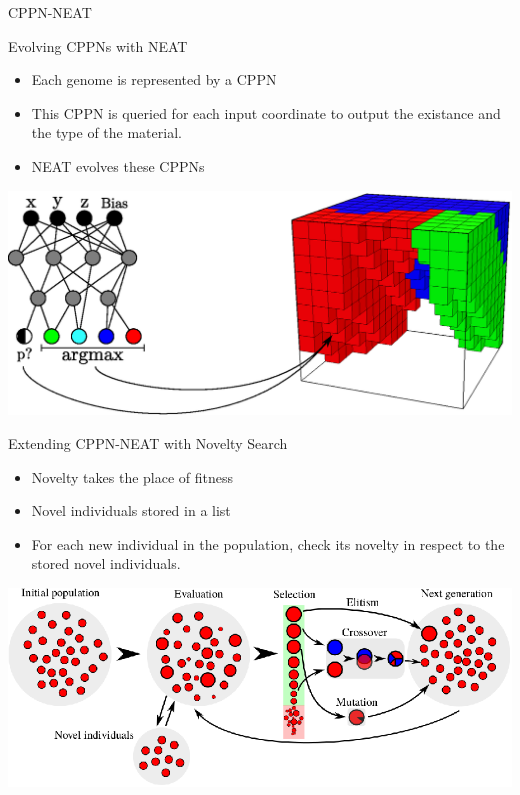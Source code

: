 \documentclass[6pt]{beamer}
\begin{document}
\begin{frame}{CPPN-NEAT}
\begin{block}{Evolving CPPNs with NEAT}
\begin{itemize}
\item Each genome is represented by a CPPN
\item This CPPN is queried for each input coordinate to output the existance and the type of the material.
\item NEAT evolves these CPPNs
\end{itemize}
\end{block}
\begin{center}
\includegraphics[height=0.45\textheight]{../Figures/Misc/cppnSoftBot.eps}
\end{center}
\end{frame}

{

\begin{frame}{Extending CPPN-NEAT with Novelty Search}
\begin{itemize}
\item Novelty takes the place of fitness
\item Novel individuals stored in a list
\item For each new individual in the population, check its novelty in respect to the stored novel individuals.
\end{itemize}
\begin{center}
\includegraphics[height=0.45\textheight]{../Figures/Misc/EvolutionNovelty.eps}
\end{center}
\end{frame}

}
\end{document}
